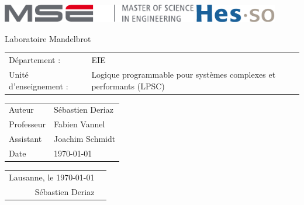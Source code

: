 \documentclass[]{article}
\newcommand{\Author}{Sébastien Deriaz}
\newcommand{\professor}{Fabien Vannel}
\newcommand{\assistant}{Joachim Schmidt}
\newcommand{\cours}{Logique programmable pour systèmes complexes et performants (LPSC)}
\newcommand{\titre}{Laboratoire Mandelbrot}
\begin{document}
\thispagestyle{empty}

\begin{center}
\includegraphics[height=8mm]{mse-full-cropped.pdf}
\hfill
\includegraphics[height=8mm]{HES-SO_logo_Pantone.pdf}
\end{center}
\vfill
\begin{center}
\Huge \titre\\
\end{center}
\begin{center}
\large
\begin{tabular}{lp{7.5cm}}
Département : & EIE\\
Unité d'enseignement : & \cours
\end{tabular}
\end{center}
\vfill
\begin{center}
\large
\begin{tabular}{ll}
\Large Auteur & \Large \Author\\
Professeur & \professor\\ 
Assistant & \assistant\\
Date & \today
\end{tabular}
\end{center}
\vfill

\pagebreak
\tableofcontents
\pagebreak

\pagebreak

\pagebreak

\pagebreak

\pagebreak


\begin{flushright}
\begin{tabular}{r m{3cm}}
Lausanne, le \today & \\
\Author & \\
\end{tabular}
\end{flushright}

\pagebreak
\end{document}

